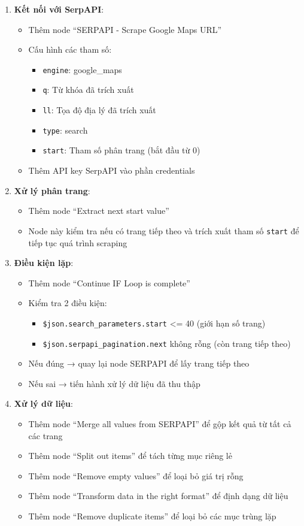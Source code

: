 \begin{enumerate}
  \item \textbf{Kết nối với SerpAPI}:
  \begin{itemize}
    \item Thêm node ``SERPAPI - Scrape Google Maps URL''
    \item Cấu hình các tham số:
    \begin{itemize}
      \item \texttt{engine}: google\_maps
      \item \texttt{q}: Từ khóa đã trích xuất
      \item \texttt{ll}: Tọa độ địa lý đã trích xuất
      \item \texttt{type}: search
      \item \texttt{start}: Tham số phân trang (bắt đầu từ 0)
    \end{itemize}
    \item Thêm API key SerpAPI vào phần credentials
  \end{itemize}

  \item \textbf{Xử lý phân trang}:
  \begin{itemize}
    \item Thêm node ``Extract next start value''
    \item Node này kiểm tra nếu có trang tiếp theo và trích xuất tham số \texttt{start} để tiếp tục quá trình scraping
  \end{itemize}

  \item \textbf{Điều kiện lặp}:
  \begin{itemize}
    \item Thêm node ``Continue IF Loop is complete''
    \item Kiểm tra 2 điều kiện:
    \begin{itemize}
      \item \texttt{\$json.search\_parameters.start} <= 40 (giới hạn số trang)
      \item \texttt{\$json.serpapi\_pagination.next} không rỗng (còn trang tiếp theo)
    \end{itemize}
    \item Nếu đúng → quay lại node SERPAPI để lấy trang tiếp theo
    \item Nếu sai → tiến hành xử lý dữ liệu đã thu thập
  \end{itemize}

  \item \textbf{Xử lý dữ liệu}:
  \begin{itemize}
    \item Thêm node ``Merge all values from SERPAPI'' để gộp kết quả từ tất cả các trang
    \item Thêm node ``Split out items'' để tách từng mục riêng lẻ
    \item Thêm node ``Remove empty values'' để loại bỏ giá trị rỗng
    \item Thêm node ``Transform data in the right format'' để định dạng dữ liệu
    \item Thêm node ``Remove duplicate items'' để loại bỏ các mục trùng lặp
  \end{itemize}


\end{enumerate}
